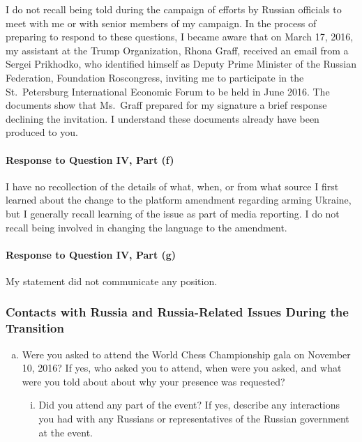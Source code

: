 I do not recall being told during the campaign of efforts by Russian officials to meet with me or with senior members of my campaign.
In the process of preparing to respond to these questions, I became aware that on March 17, 2016, my assistant at the Trump Organization, Rhona Graff, received an email from a Sergei Prikhodko, who identified himself as Deputy Prime Minister of the Russian Federation, Foundation Roscongress, inviting me to participate in the St.~Petersburg International Economic Forum to be held in June 2016.
The documents show that Ms.~Graff prepared for my signature a brief response declining the invitation.
I understand these documents already have been produced to you.

\paragraph*{Response to Question IV, Part (f)}

I have no recollection of the details of what, when, or from what source I first learned about the change to the platform amendment regarding arming Ukraine, but I generally recall learning of the issue as part of media reporting.
I do not recall being involved in changing the language to the amendment.

\paragraph*{Response to Question IV, Part (g)}

My statement did not communicate any position.

\subsubsection{Contacts with Russia and Russia-Related Issues During the Transition}

\begin{enumerate}[a.]

\item Were you asked to attend the World Chess Championship gala on November 10, 2016?
If yes, who asked you to attend, when were you asked, and what were you told about about why your presence was requested?

\begin{enumerate}[i.]

\item Did you attend any part of the event?
If yes, describe any interactions you had with any Russians or representatives of the Russian government at the event.

\end{enumerate}

\end{enumerate}

